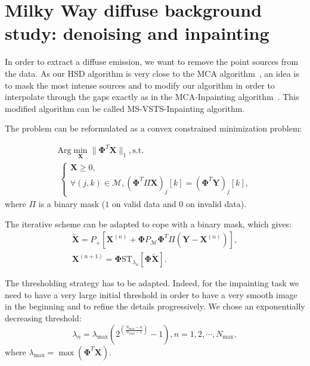 \chapter{Milky Way diffuse background study: denoising and inpainting}
\label{ch_inpainting}


In order to extract a  diffuse emission, we want to remove the  point sources from the data. 
As our HSD algorithm is very close to the MCA algorithm~\citep{starck:sta04}, an idea is to mask the most intense sources and to modify our algorithm in order to interpolate through the gaps exactly as in the MCA-Inpainting algorithm~\citep{inpainting:abrial06}. 
This modified algorithm can be called MS-VSTS-Inpainting algorithm.

The problem can be reformulated as a convex constrained minimization problem:

\begin{equation}
\label{inp_eq34}
\begin{split}
\text{Arg} \min_{\mathbf{X}} \| \mathbf{ \Phi}^{T}\mathbf{X}\|_1,
\text{s.t.} \\ \: \left\{\begin{array}{c}\mathbf{X} \geqslant 0 , \\\forall (j,k)\in \mathcal{M},      (\mathbf{ \Phi}^{T}\Pi \mathbf{X})_j[k]=(\mathbf{ \Phi}^{T} \mathbf{Y})_j[k] , \end{array}\right. 
\end{split}
\end{equation}
where $\Pi$ is a binary mask ($1$ on valid data and $0$ on invalid data).

The iterative scheme can be adapted to cope with a binary mask, which gives:
\begin{eqnarray}
\tilde{\mathbf{X}} = P_{+}[\mathbf{ X}^{(n)} + \mathbf{ \Phi} P_{\mathcal{M}} \mathbf{ \Phi}^{T} \Pi (\mathbf{ Y} - \mathbf{ X}^{(n)})] , \\
\mathbf{X}^{(n+1)} = \mathbf{ \Phi} \text{ST}_{\lambda_n}[\mathbf{ \Phi}\tilde{\mathbf{X}}] .
\end{eqnarray}


The thresholding strategy has to be adapted. Indeed, for the impainting task we need to have a very large initial threshold in order to have a very smooth image in the beginning and to refine the details progressively. We chose an exponentially decreasing threshold:
\begin{equation}
\label{eq42}
\lambda_{n} = \lambda_{\max}  (2^{(\frac{N_{\max} - n}{N_{\max} - 1})} -1),n=1,2,\cdots,N_{\max} ,
\end{equation}
where $\lambda_{\max} = \max (\mathbf{\Phi}^{T}\mathbf{X})$.

